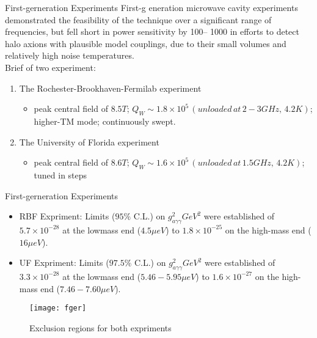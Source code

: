 \documentclass{beamer}
\begin{document}
\begin{frame}{First-gerneration Experiments}
First-g eneration microwave cavity experiments demonstrated the
feasibility of the technique over a significant range of
frequencies, but fell short in power sensitivity by 100–
1000 in efforts to detect halo axions with plausible model couplings, due to their \alert{small volumes}
and relatively \alert{high noise temperatures}.\\
Brief of two experiment:
\begin{enumerate}
\item The Rochester-Brookhaven-Fermilab experiment\\
\begin{itemize}
\item peak central field of $8.5T$; $Q_W \sim 1.8 \times 10^5 \,(unloaded\,at\,2-3GHz,\,4.2K)$; higher-TM mode; continuously swept.
\end{itemize}
\item The University of Florida experiment
\begin{itemize}
\item peak central field of $8.6T$; $Q_W \sim 1.6 \times 10^5 \,(unloaded\,at\,1.5GHz,\,4.2K)$; tuned in steps
\end{itemize}
\end{enumerate}
\end{frame}
\begin{frame}{First-gerneration Experiments}
\begin{itemize}
\item RBF Expriment: Limits ($95\%$ C.L.) on $g_{a\gamma\gamma}^2 GeV^2$
were established of $5.7 \times 10^{-28}$ at the lowmass end ($4.5\mu eV$) to $1.8\times10^{-25}$ on the high-mass end ($16\mu eV$).
\item UF Expriment: Limits ($97.5\%$ C.L.) on $g_{a\gamma\gamma}^2 GeV^2$
were established of $3.3 \times 10^{-28}$ at the lowmass end ($5.46-5.95\mu eV$) to $1.6\times10^{-27}$ on the high-mass end 
($7.46-7.60\mu eV$).
\end{itemize}
\begin{figure} 
    \centering
    \texttt{[image: fger]}
    \caption{Exclusion regions for both expriments}
\end{figure}
\end{frame}

\end{document}
